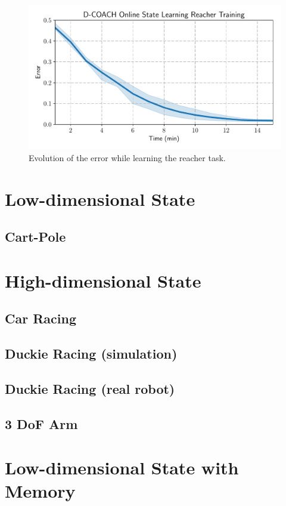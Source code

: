 \begin{figure}[h]
    \centering
    \includegraphics[width=0.9\linewidth]{imagenes/cap3/reacher_ICRA.pdf}
    \caption{Evolution of the error while learning the reacher task. }
    \label{fig:reacher_exp}
\end{figure}



\section{Low-dimensional State}


\subsection{Cart-Pole}

\section{High-dimensional State}
\subsection{Car Racing}
\subsection{Duckie Racing (simulation)}
\subsection{Duckie Racing (real robot)}
\subsection{3 DoF Arm}

\section{Low-dimensional State with Memory}
